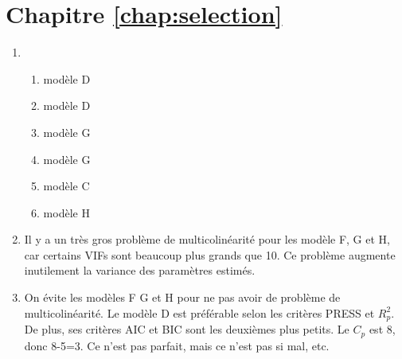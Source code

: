 \section*{Chapitre \ref{chap:selection}}

\begin{solution}{2.1}
\begin{enumerate}
\item
\begin{enumerate}
\item modèle D
\item modèle D
\item modèle G
\item modèle G
\item modèle C
\item modèle H
\end{enumerate}

\item Il y a un très gros problème de multicolinéarité pour les modèle F, G et H, car certains VIFs sont beaucoup plus grands que 10. Ce problème augmente inutilement la variance des paramètres estimés.

\item On évite les modèles F G et H pour ne pas avoir de problème de multicolinéarité. Le modèle D est préférable selon les critères PRESS et $R^2_p$. De plus, ses critères AIC et BIC sont les deuxièmes plus petits. Le $C_p$ est 8, donc 8-5=3. Ce n'est pas parfait, mais ce n'est pas si mal, etc.

\end{enumerate}
\end{solution}
